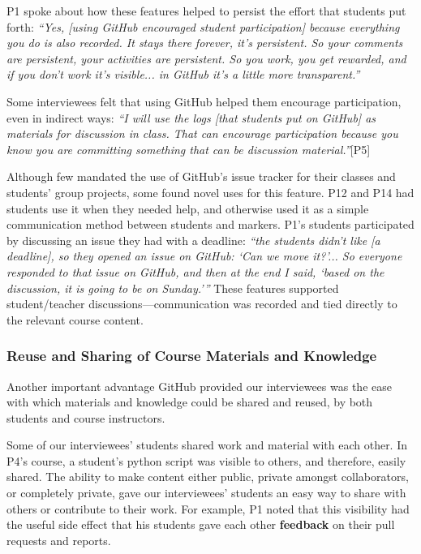 P1 spoke about how these features helped to persist the effort that students put forth:
\textit{``Yes, [using GitHub encouraged student participation] because everything you do is also recorded. It stays there forever, it's persistent. So your comments are persistent, your activities are persistent. So you work, you get rewarded, and if you don't work it's visible... in GitHub it's a little more transparent.''}

Some interviewees felt that using GitHub helped them encourage participation, even in indirect ways: \textit{``I will use the logs [that students put on GitHub] as materials for discussion in class. That can encourage participation because you know you are committing something that can be discussion material.''}[P5]

Although few mandated the use of GitHub's issue tracker for their classes and students' group projects, some found novel uses for this feature. P12 and P14 had students use it when they needed help, and otherwise used it as a simple communication method between students and markers. P1's students participated by discussing an issue they had with a deadline: \textit{``the students didn't like [a deadline], so they opened an issue on GitHub: `Can we move it?'... So everyone responded to that issue on GitHub, and then at the end I said, `based on the discussion, it is going to be on Sunday.'''} These features supported student/teacher discussions---communication was recorded and tied directly to the relevant course content.

\subsubsection{Reuse and Sharing of Course Materials and Knowledge}

Another important advantage GitHub provided our interviewees was the ease with which materials and knowledge could be shared and reused, by both students and course instructors.

Some of our interviewees' students shared work and material with each other. In P4's course, a student's python script was visible to others, and therefore, easily shared. The ability to make content either public, private amongst collaborators, or completely private, gave our interviewees' students an easy way to share with others or contribute to their work. For example, P1 noted that this visibility had the useful side effect that his students gave each other \textbf{feedback} on their pull requests and reports.

